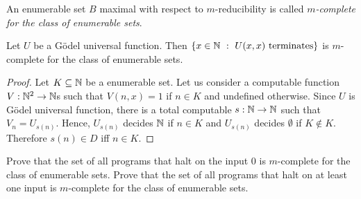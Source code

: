 \begin{definition}
  An enumerable set $B$ maximal with respect to $m$-reducibility is called
  \emph{$m$-complete for the class of enumerable sets}.
\end{definition}

\begin{theorem}
\label{theorem:m-complete-enumerable}
  Let $U$ be a G\"odel universal function. 
  Then $\set[U(x, x) \text{ terminates}]{x \in \N}$ is $m$-complete for the
  class of enumerable sets.
\end{theorem}
\begin{proof}
  Let $K \subseteq {\mathbb{N}}$ be a enumerable set. Let us consider a computable
  function $V : {\mathbb{N}}^2 \to {\mathbb{N}}$s such that $V(n, x) = 1$ if $n \in K$ and undefined
  otherwise. Since $U$ is G\"odel universal function, there is a total
  computable $s : {\mathbb{N}} \to {\mathbb{N}}$ such that $V_n = U_{s(n)}$. Hence,  $U_{s(n)}$
  decides ${\mathbb{N}}$ if $n \in K$ and $U_{s(n)}$ decides $\emptyset$ if $K \not\in K$.
  Therefore $s(n) \in D$ iff $n \in K$.
\end{proof}

\begin{chapterendexercises}
  \exercise Prove that the set of all programs that halt on the input $0$ is
    $m$-complete for the class of enumerable sets.
  \exercise Prove that the set of all programs that halt on at least one input
  is $m$-complete for the class of enumerable sets.
\end{chapterendexercises}
